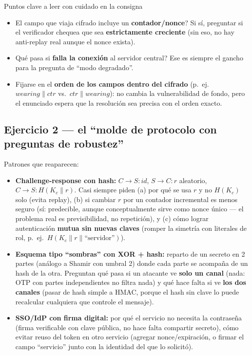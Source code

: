 \begin{defbox}{Puntos clave a leer con cuidado en la consigna}
\begin{itemize}
  \item \textquestiondown{}El campo que viaja cifrado incluye un \textbf{contador/nonce}? Si sí, preguntar si
  el verificador chequea que sea \textbf{estrictamente creciente} (sin eso, no hay
  anti-replay real aunque el nonce exista).
  \item \textquestiondown{}Qué pasa si \textbf{falla la conexión} al servidor central? Ese es siempre el
  gancho para la pregunta de ``modo degradado''.
  \item Fijarse en el \textbf{orden de los campos dentro del cifrado} (p.\ ej.
  $\mathit{wearing}\|ctr$ vs.\ $ctr\|\mathit{wearing}$): no cambia la vulnerabilidad de
  fondo, pero el enunciado espera que la resolución sea precisa con el orden exacto.
\end{itemize}
\end{defbox}

\subsection{Ejercicio 2 --- el ``molde de protocolo con preguntas de robustez''}
Patrones que reaparecen:
\begin{itemize}
  \item \textbf{Challenge-response con hash:} $C\to S: id$, $S\to C: r$ aleatorio,
  $C\to S: H(K_c\|r)$. Casi siempre piden (a) por qué se usa $r$ y no $H(K_c)$ solo (evita
  replay), (b) si cambiar $r$ por un contador incremental es menos seguro (sí: predecible,
  aunque conceptualmente sirve como nonce único --- el problema real es previsibilidad, no
  repetición), y (c) cómo lograr autenticación \textbf{mutua sin nuevas claves} (romper la
  simetría con literales de rol, p.\ ej.\ $H(K_c\|r\|\text{``servidor''})$).
  \item \textbf{Esquema tipo ``sombras'' con XOR + hash:} reparto de un secreto en 2 partes
  (análogo a Shamir con umbral 2) donde cada parte se acompaña de un hash de la otra.
  Preguntan qué pasa si un atacante ve \textbf{solo un canal} (nada: OTP con partes
  independientes no filtra nada) y qué hace falta si ve \textbf{los dos canales} (pasar de
  hash simple a HMAC, porque el hash sin clave lo puede recalcular cualquiera que controle
  el mensaje).
  \item \textbf{SSO/IdP con firma digital:} por qué el servicio no necesita la contraseña
  (firma verificable con clave pública, no hace falta compartir secreto), cómo evitar reuso
  del token en otro servicio (agregar nonce/expiración, o firmar el campo ``servicio''
  junto con la identidad del que lo solicitó).
\end{itemize}

